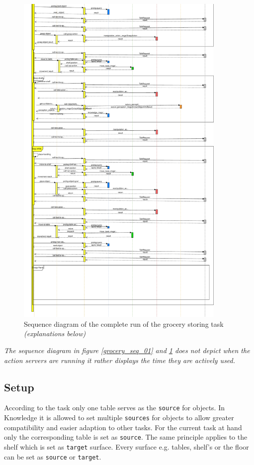 \documentclass[main.tex]{subfiles}
\begin{document}
		\begin{figure}[H]
			\centering
			\includegraphics[width=0.9\textwidth]{pictures/diagramms/grocery_02_seq}
			\caption{Sequence diagram of the complete run of the grocery storing task \textit{(explanations below)}}
			\label{grocery_seq_02}
		\end{figure}
		\textit{The sequence diagram in figure \ref{grocery_seq_01} and \ref{grocery_seq_02} does not depict when the action servers are running it rather displays the time they are actively used.}
	
	\subsection{Setup}
	

	\begin{knowledge}
	According to the task only one table serves as the \texttt{source} for objects. In Knowledge it is allowed to set multiple \texttt{sources} for objects to allow greater compatibility and easier adaption to other tasks. For the current task at hand only the corresponding table is set as \texttt{source}. The same principle applies to the shelf which is set as \texttt{target} surface. Every surface e.g. tables, shelf's or the floor can be set as \texttt{source} or \texttt{target}.
	\end{knowledge}
	
\end{document}
